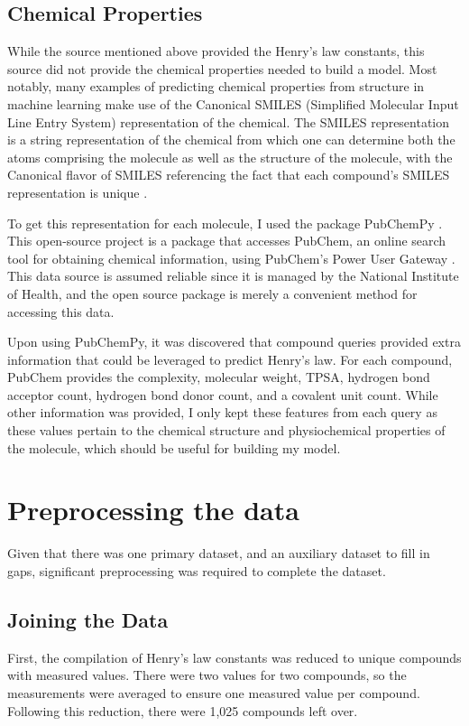 \documentclass[12pt, oneside]{article}   	%
\begin{document}
\subsection{Chemical Properties}
While the source mentioned above provided the Henry's law constants, this source did not provide the chemical properties needed to build a model. Most notably, many examples of predicting chemical properties from structure in machine learning make use of the Canonical SMILES (Simplified Molecular Input Line Entry System) representation of the chemical. The SMILES representation is a string representation of the chemical from which one can determine both the atoms comprising the molecule as well as the structure of the molecule, with the Canonical flavor of SMILES referencing the fact that each compound's SMILES representation is unique \cite{oboyle2012}.

To get this representation for each molecule, I used the package PubChemPy \cite{PubChemPy}. This open-source project is a package that accesses PubChem, an online search tool for obtaining chemical information, using PubChem's Power User Gateway \cite{kim2015}. This data source is assumed reliable since it is managed by the National Institute of Health, and the open source package is merely a convenient method for accessing this data.

Upon using PubChemPy, it was discovered that compound queries provided extra information that could be leveraged to predict Henry's law. For each compound, PubChem provides the complexity, molecular weight, TPSA, hydrogen bond acceptor count, hydrogen bond donor count, and a covalent unit count. While other information was provided, I only kept these features from each query as these values pertain to the chemical structure and physiochemical properties of the molecule, which should be useful for building my model.

\section{Preprocessing the data}
Given that there was one primary dataset, and an auxiliary dataset to fill in gaps, significant preprocessing was required to complete the dataset.

\subsection{Joining the Data}
First, the compilation of Henry's law constants was reduced to unique compounds with measured values. There were two values for two compounds, so the measurements were averaged to ensure one measured value per compound. Following this reduction, there were 1,025 compounds left over.
\end{document}
